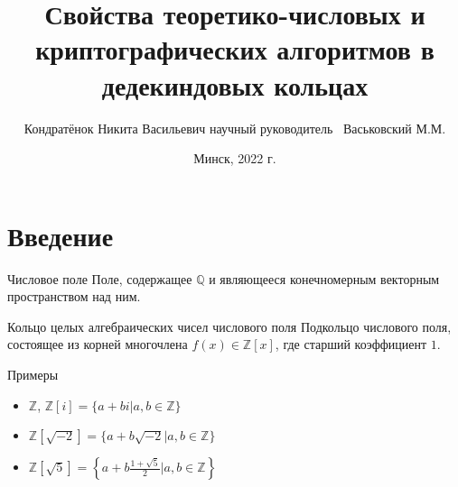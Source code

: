\documentclass[8pt, xcolor=x11names]{beamer}
\author[Кондратёнок Н.В.]{
    \texorpdfstring{Кондратёнок Никита Васильевич\newline\newline
    научный руководитель \textendash\ Васьковский М.М.\newline\newline
}{author}}
\title[]{
    \texorpdfstring{Свойства теоретико-числовых и криптографических алгоритмов в дедекиндовых кольцах}{long name}
}
\institute[Кафедра высшей математики]{Кафедра высшей математики}
\date{Минск, 2022 г.}
\begin{document}
\begin{frame}
    \titlepage
\end{frame}

\section{Введение}

\begin{frame}
    \begin{block}{Числовое поле}
        Поле, содержащее $\mathbb{Q}$ и являющееся конечномерным векторным пространством над ним.
    \end{block}

    \begin{block}{Кольцо целых алгебраических чисел числового поля}
        Подкольцо числового поля, состоящее из корней многочлена $f(x) \in \mathbb{Z}[x]$, где старший коэффициент $1$.
    \end{block}
    
    \begin{block}{Примеры}
        \begin{itemize}
            \item $\mathbb{Z}$, $\mathbb{Z}[i] = \{a + bi | a, b\in\mathbb{Z}\}$
            \item $\mathbb{Z}[\sqrt{-2}] = \{a + b\sqrt{-2} | a, b\in\mathbb{Z}\}$
            \item $\mathbb{Z}[\sqrt{5}] = \left\{a + b\frac{1+\sqrt{5}}{2} | a, b\in\mathbb{Z}\right\}$
        \end{itemize}
    \end{block}
\end{frame}
\end{document}

